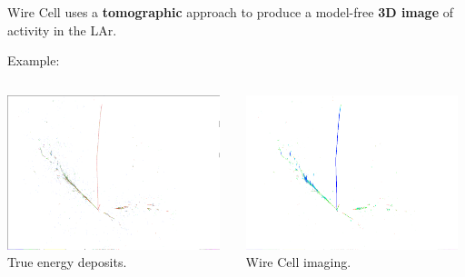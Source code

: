 \begin{frame}[fragile]
  Wire Cell uses a \textbf{tomographic} approach to produce a
  model-free \textbf{3D image} of activity in the LAr.

  \vfill
  Example:

  \begin{columns}

    \begin{column}{0.5\textwidth}
      \begin{center}
        \includegraphics[trim=1cm 2cm 1cm 2mm, clip, height=45mm]{bee-true.png}\\
        True energy deposits.
      \end{center}
    \end{column}

    \begin{column}{0.5\textwidth}
      \begin{center}
        \includegraphics[trim=1cm 2cm 1cm 2mm, clip, height=45mm]{bee-reco.png}\\
        Wire Cell imaging.
      \end{center}
      
    \end{column}
  \end{columns}

  \vfill

\end{frame}




